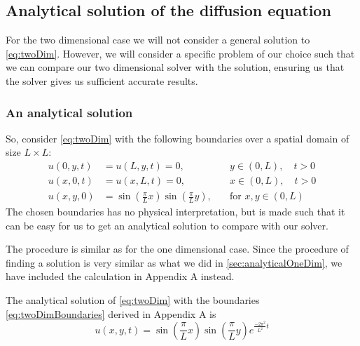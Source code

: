 \subsection{Analytical solution of the diffusion equation}
For the two dimensional case we will not consider a general solution to \vref{eq:twoDim}. However, we will consider a specific problem of our choice such that we can compare our two dimensional solver with the solution, ensuring us that the solver gives us sufficient accurate results.
\subsubsection{An analytical solution}
So, consider \vref{eq:twoDim} with the following boundaries over a spatial domain of size \(L \times L\):
\begin{equation} \label{eq:twoDimBoundaries}
\begin{aligned}
u(0,y,t) &= u(L,y,t) = 0, \quad &y \in (0,L),\quad t > 0 \\
u(x,0,t) &= u(x,L,t) = 0, \quad &x \in (0,L),\quad t > 0 \\
u(x,y,0) &= \sin(\frac{\pi}{L}x)\sin(\frac{\pi}{L}y), \quad&\text{for }x,y\in (0,L)
\end{aligned}
\end{equation}
The chosen boundaries has no physical interpretation, but is made such that it can be easy for us to get an analytical solution to compare with our solver.

The procedure is similar as for the one dimensional case. Since the procedure of finding a solution is very similar as what we did in \vref{sec:analyticalOneDim}, we have included the calculation in Appendix A instead.

The analytical solution of \vref{eq:twoDim} with the boundaries \vref{eq:twoDimBoundaries} derived in Appendix A is
\begin{equation} \label{eq:analyticalSolutionTwoDim}
u(x,y,t) = \sin(\frac{\pi}{L}x)\sin(\frac{\pi}{L}y)e^{\frac{-2\pi^2}{L^2}t}
\end{equation}
